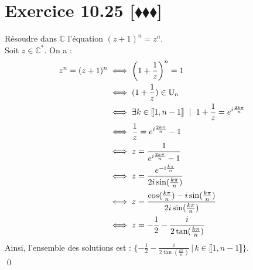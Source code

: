 \documentclass[10pt]{article}
\begin{document}
\section*{Exercice 10.25 [$\blacklozenge\blacklozenge\blacklozenge$]}
\begin{tcolorbox}[enhanced, width=7in, center, size=fbox, fontupper=\large, drop shadow southwest]
    Résoudre dans $\mathbb{C}$ l'équation $(z+1)^n=z^n$.\\
    Soit $z\in\mathbb{C}^*$. On a :
    \begin{align*}
        z^n=(z+1)^n &\iff \left(1+\frac{1}{z}\right)^n=1\\
        &\iff(1+\frac{1}{z})\in\mathbb{U}_n\\
        &\iff\exists k\in\llbracket1,n-1\rrbracket \hspace{0.2cm} | \hspace{0.2cm} 1+\frac{1}{z}=e^{i\frac{2k\pi}{n}}\\
        &\iff\frac{1}{z}=e^{i\frac{2k\pi}{n}}-1\\
        &\iff z=\frac{1}{e^{i\frac{2k\pi}{n}}-1}\\
        &\iff z=\frac{e^{-i\frac{k\pi}{n}}}{2i\sin(\frac{k\pi}{n})}\\
        &\iff z=\frac{\cos(\frac{k\pi}{n})-i\sin(\frac{k\pi}{n})}{2i\sin(\frac{k\pi}{n})}\\
        &\iff z=-\frac{1}{2}-\frac{i}{2\tan(\frac{k\pi}{n})}
    \end{align*}
    Ainsi, l'ensemble des solutions est : $\{-\frac{1}{2}-\frac{i}{2\tan(\frac{k\pi}{n})} \, | \, k\in\llbracket1,n-1\rrbracket\}$.\\
    \qed
\end{tcolorbox}
\end{document}
